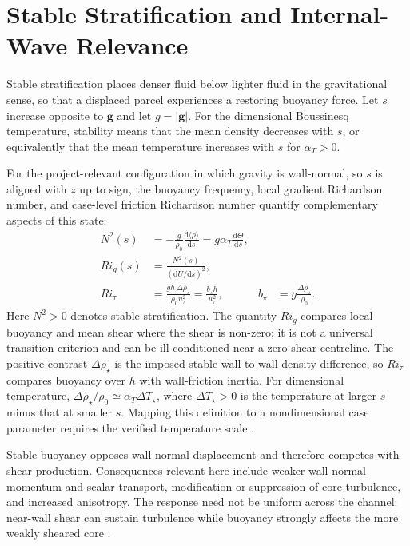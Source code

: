 \section{Stable Stratification and Internal-Wave Relevance}
\label{sec:stable-stratification-wave-relevance}

Stable stratification places denser fluid below lighter fluid in the
gravitational sense, so that a displaced parcel experiences a restoring
buoyancy force. Let $s$ increase opposite to $\mathbf{g}$ and let
$g=|\mathbf{g}|$. For the dimensional Boussinesq temperature, stability means
that the mean density decreases with $s$, or equivalently that the mean
temperature increases with $s$ for $\alpha_T>0$.

For the project-relevant configuration in which gravity is wall-normal, so
$s$ is aligned with $z$ up to sign, the buoyancy frequency, local gradient
Richardson number, and case-level friction Richardson number quantify
complementary aspects of this state:
\begin{equation}
  \begin{aligned}
    N^2(s)&=-\frac{g}{\rho_0}
      \frac{\mathrm{d}\langle\rho\rangle}{\mathrm{d}s}
      =g\alpha_T\frac{\mathrm{d}\Theta}{\mathrm{d}s},\\
    Ri_g(s)&=\frac{N^2(s)}{
      \left(\mathrm{d}U/\mathrm{d}s\right)^2},\\
    Ri_\tau&=\frac{g h\,\Delta\rho_\star}{\rho_0u_\tau^2}
      =\frac{b_\star h}{u_\tau^2},
    &b_\star&=g\frac{\Delta\rho_\star}{\rho_0}.
  \end{aligned}
  \label{eq:stratification-scales}
\end{equation}
Here $N^2>0$ denotes stable stratification. The quantity $Ri_g$ compares local
buoyancy and mean shear where the shear is non-zero; it is not a universal
transition criterion and can be ill-conditioned near a zero-shear centreline.
The positive contrast $\Delta\rho_\star$ is the imposed stable wall-to-wall
density difference, so $Ri_\tau$ compares buoyancy over $h$ with wall-friction
inertia. For dimensional temperature,
$\Delta\rho_\star/\rho_0\simeq\alpha_T\Delta T_\star$, where
$\Delta T_\star>0$ is the temperature at larger $s$ minus that at smaller $s$.
Mapping this definition to a nondimensional case parameter requires the
verified temperature scale
\cite{garciaVillalbaDelAlamo2011}.

Stable buoyancy opposes wall-normal displacement and therefore competes with
shear production. Consequences relevant here include weaker wall-normal
momentum and scalar transport, modification or suppression of core turbulence,
and increased anisotropy. The response need not be uniform across the channel:
near-wall shear can sustain turbulence while buoyancy strongly affects the
more weakly sheared core
\cite{armenioSarkar2002,garciaVillalbaDelAlamo2011}.

